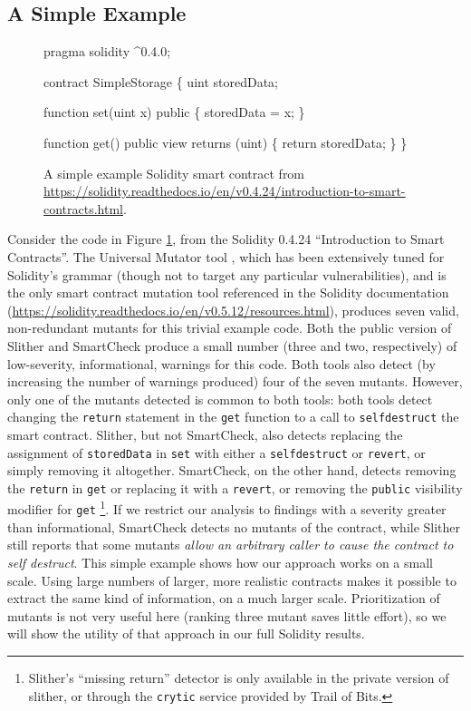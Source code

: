 \subsection{A Simple Example}

\begin{figure}
{\scriptsize
\begin{code}
pragma solidity ^0.4.0;

contract SimpleStorage \{
    uint storedData;

    function set(uint x) public \{
        storedData = x;
    \}

    function get() public view returns (uint) \{
        return storedData;
    \}
  \}
\end{code}
}
\caption{A simple example Solidity smart contract from \url{https://solidity.readthedocs.io/en/v0.4.24/introduction-to-smart-contracts.html}.}
\label{fig:sol424intro}
\end{figure}

Consider the code in Figure \ref{fig:sol424intro}, from the Solidity 0.4.24 ``Introduction to Smart Contracts''.  The Universal Mutator tool \cite{universalmutator,regexpMut}, which has been extensively tuned for Solidity's grammar (though not to target any particular vulnerabilities), and is the only smart contract mutation tool referenced in the Solidity documentation (\url{https://solidity.readthedocs.io/en/v0.5.12/resources.html}), produces seven valid, non-redundant mutants for this trivial example code.  Both the public version of Slither \cite{slither} and SmartCheck \cite{smartcheck} produce a small number (three and two, respectively) of low-severity, informational, warnings for this code.  Both tools also detect (by increasing the number of warnings produced) four of the seven mutants.  However, only one of the mutants detected is common to both tools: both tools detect changing the {\tt return} statement in the {\tt get} function to a call to {\tt selfdestruct} the smart contract.  Slither, but not SmartCheck, also detects replacing the assignment of {\tt storedData} in {\tt set} with either a {\tt selfdestruct} or {\tt revert}, or simply removing it altogether.  SmartCheck, on the other hand, detects removing the {\tt return} in {\tt get} or replacing it with a {\tt revert}, or removing the {\tt public} visibility modifier for {\tt get} \footnote{Slither's ``missing return'' detector is only available in the private version of slither, or through the {\tt crytic} service provided by Trail of Bits.}.  If we restrict our analysis to findings with a severity greater than informational, SmartCheck detects no mutants of the contract, while Slither still reports that some mutants \emph{allow an arbitrary caller to cause the contract to self destruct}.  This simple example shows how our approach works on a small scale.  Using large numbers of larger, more realistic contracts makes it possible to extract the same kind of information, on a much larger scale.  Prioritization of mutants is not very useful here (ranking three mutant saves little effort), so we will show the utility of that approach in our full Solidity results.

